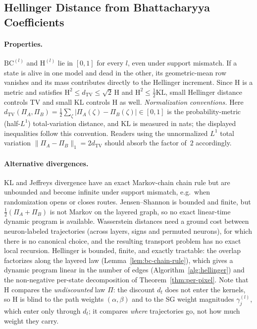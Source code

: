 \documentclass[twoside]{article}
\newcommand{\1}{\mathbf{1}}
\begin{document}
\subsection{Hellinger Distance from Bhattacharyya Coefficients}\label{sec:lmp-hellinger-distance}

\paragraph{Properties.}
$\mathrm{BC}^{(l)}$ and $\mathrm{H}^{(l)}$ lie in $[0,1]$ for every $l$, even under support
mismatch.  If a state is alive in one model and dead in the other, its geometric-mean row vanishes
and its mass contributes directly to the Hellinger increment.  Since $\mathrm{H}$ is a metric and
satisfies $\mathrm{H}^2 \le d_{\mathrm{TV}} \le \sqrt{2}\,\mathrm{H}$ and $\mathrm{H}^2 \le
    \tfrac{1}{2}\mathrm{KL}$, small Hellinger distance controls TV and small KL controls H as well.
\emph{Normalization conventions.} Here $d_{\mathrm{TV}}(\Pi_A, \Pi_B) = \tfrac{1}{2}\sum_{\zeta}
    |\Pi_A(\zeta)-\Pi_B(\zeta)| \in [0,1]$ is the probability-metric (half-$L^1$) total-variation
distance, and $\mathrm{KL}$ is measured in nats; the displayed inequalities follow this convention.
Readers using the unnormalized $L^1$ total variation $\|\Pi_A-\Pi_B\|_1 = 2 d_{\mathrm{TV}}$ should
absorb the factor of~$2$ accordingly.

\paragraph{Alternative divergences.}\label{app:why-hellinger}
KL and Jeffreys divergence have an exact Markov-chain chain rule but are unbounded and become
infinite under support mismatch, e.g.\ when randomization opens or closes routes.  Jensen--Shannon
is bounded and finite, but $\tfrac{1}{2}(\Pi_A + \Pi_B)$ is not Markov on the layered graph, so no
exact linear-time dynamic program is available.  Wasserstein distances need a ground cost between
neuron-labeled trajectories (across layers, signs and permuted neurons), for which there is no
canonical choice, and the resulting transport problem has no exact local recursion.  Hellinger is
bounded, finite, and exactly tractable: the overlap factorizes along the layered law
(Lemma~\ref{lem:bc-chain-rule}), which gives a dynamic program linear in the number of edges
(Algorithm~\ref{alg:hellinger}) and the non-negative per-state decomposition of
Theorem~\ref{thm:per-pixel}.  Note that $\mathrm{H}$ compares the \emph{undiscounted} law $\Pi$:
the discount $d_t$ does not enter the kernels, so $\mathrm{H}$ is blind to the path weights
$(\alpha,\beta)$ and to the \ac{SG} weight magnitudes $\gamma^{(l)}_j$, which enter only through
$d_t$; it compares \emph{where} trajectories go, not how much weight they carry.
\end{document}
